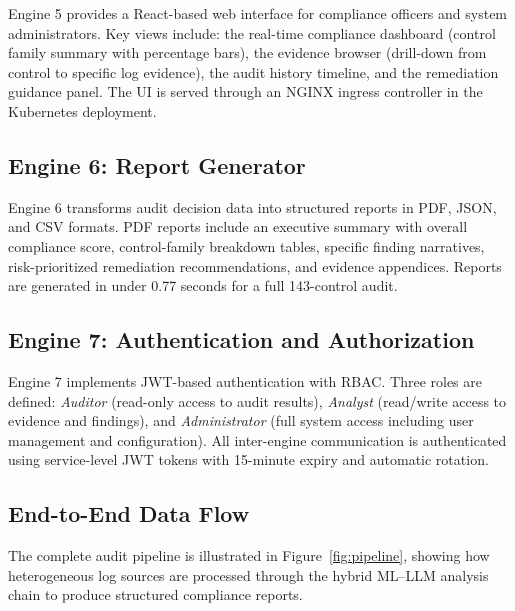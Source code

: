 \documentclass[12pt,oneside]{report}
\begin{document}
Engine 5 provides a React-based web interface for compliance officers and system administrators. Key views include: the real-time compliance dashboard (control family summary with percentage bars), the evidence browser (drill-down from control to specific log evidence), the audit history timeline, and the remediation guidance panel. The UI is served through an NGINX ingress controller in the Kubernetes deployment.

\subsection{Engine 6: Report Generator}

Engine 6 transforms audit decision data into structured reports in PDF, JSON, and CSV formats. PDF reports include an executive summary with overall compliance score, control-family breakdown tables, specific finding narratives, risk-prioritized remediation recommendations, and evidence appendices. Reports are generated in under 0.77 seconds for a full 143-control audit.

\subsection{Engine 7: Authentication and Authorization}

Engine 7 implements JWT-based authentication with RBAC. Three roles are defined: \textit{Auditor} (read-only access to audit results), \textit{Analyst} (read/write access to evidence and findings), and \textit{Administrator} (full system access including user management and configuration). All inter-engine communication is authenticated using service-level JWT tokens with 15-minute expiry and automatic rotation.

\subsection{End-to-End Data Flow}

The complete audit pipeline is illustrated in Figure~\ref{fig:pipeline}, showing how heterogeneous log sources are processed through the hybrid ML--LLM analysis chain to produce structured compliance reports.
\end{document}
